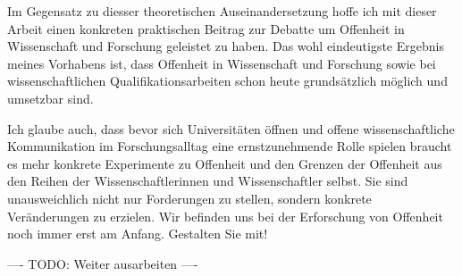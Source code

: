 Im Gegensatz zu diesser theoretischen Auseinandersetzung hoffe ich mit dieser Arbeit einen konkreten praktischen Beitrag zur Debatte um Offenheit in Wissenschaft und Forschung geleistet zu haben. Das wohl eindeutigste Ergebnis meines Vorhabens ist, dass Offenheit in Wissenschaft und Forschung sowie bei wissenschaftlichen Qualifikationsarbeiten schon heute grundsätzlich möglich und umsetzbar sind.

Ich glaube auch, dass bevor sich Universitäten öffnen und offene wissenschaftliche Kommunikation im Forschungsalltag eine ernstzunehmende Rolle spielen braucht es mehr konkrete Experimente zu Offenheit und den Grenzen der Offenheit aus den Reihen der Wissenschaftlerinnen und Wissenschaftler selbst. Sie sind unausweichlich nicht nur Forderungen zu stellen, sondern konkrete Veränderungen zu erzielen. Wir befinden uns bei der Erforschung von Offenheit noch immer erst am Anfang. Gestalten Sie mit!

---- TODO: Weiter ausarbeiten ----
